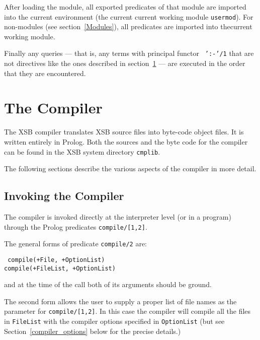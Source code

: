 After loading the module, all exported predicates of that module are
imported into the current environment (the current current working
module {\tt usermod}).  For non-modules (see section~\ref{Modules}),
all predicates are imported into thecurrent working module.

Finally any queries --- that is, any terms with principal functor {\tt
':-'/1} that are not directives like the ones described in
section~\ref{the_compiler} --- are executed in the order that they are
encountered.

\section{The Compiler} \label{the_compiler} 

The XSB compiler translates XSB source files into
byte-code object files.  It is written entirely in Prolog.
Both the sources and the byte code
for the compiler can be found in the XSB system directory
{\tt cmplib}.

The following sections describe the various aspects of the compiler 
in more detail.


\subsection{Invoking the Compiler} \label{compiler_invoking}

The compiler is invoked directly at the interpreter level (or in a 
program) through the Prolog predicates {\tt compile/[1,2]}.  

The general forms of predicate {\tt compile/2} are:
\begin{center}{\tt	
	compile(+File, +OptionList) \\
	compile(+FileList, +OptionList)
}
\end{center}
and at the time of the call both of its arguments should be ground.

The second form allows the user to supply a proper list of file names as
the parameter for {\tt compile/[1,2]}.  In this case the compiler will
compile all the files in {\tt FileList} with the compiler
options specified in {\tt OptionList} (but see
Section~\ref{compiler_options} below for the precise details.)

